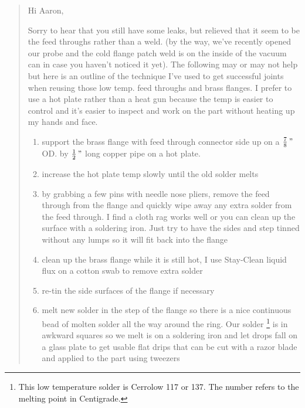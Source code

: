 \begin{quotation}


Hi Aaron,

Sorry to hear that you still have some leaks, but relieved that it seem to
be the feed throughs rather than a weld. (by the way, we've recently opened
our probe and the cold flange patch weld is on the inside of the vacuum
can in case you haven't noticed it yet).  The following may or may not
help but here is an outline of the technique I've used to get successful
joints when reusing those low temp. feed throughs and brass flanges.  I prefer
to use a hot plate rather than a heat gun because the temp is easier to
control and it's easier to inspect and work on the part without heating up
my hands and face.

\begin{enumerate}
\item support the brass flange with feed through connector side up on a 
$\frac{7}{8}\,\mbox{''}$ OD.
by $\frac{1}{2}\,\mbox{''}$ long copper pipe on a hot plate.

\item increase the hot plate temp slowly until the old solder melts

\item by grabbing a few pins with needle nose pliers, remove the feed through
from the flange and quickly wipe away any extra solder from the feed through. 
I find a cloth rag works well or you can clean up the surface with a
soldering iron.  Just try to have the sides and step tinned without any
lumps so it will fit back into the flange

\item clean up the brass flange while it is still hot, I use Stay-Clean
liquid flux on a cotton swab to remove extra solder

\item  re-tin the side surfaces of the flange if necessary

\item melt new solder in the step of the flange so there is a nice continuous
bead of molten solder all the way around the ring.  Our solder%
\footnote{This low temperature solder is Cerrolow 117 or 137. The number
refers to the melting point in Centigrade.} is in
awkward squares so we melt is on a soldering iron and let drops fall on a
glass plate to get usable flat drips that can be cut with a razor blade
and applied to the part using tweezers


\end{enumerate}
\end{quotation}
